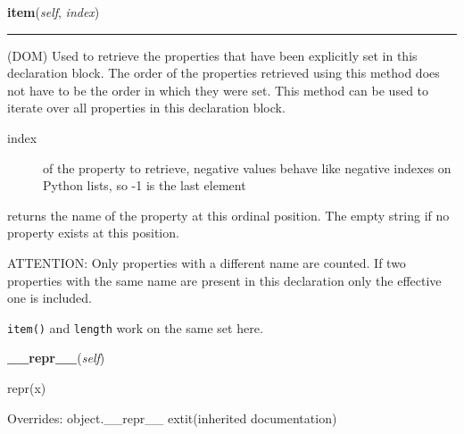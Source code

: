     \label{cssutils:css:cssstyledeclaration:CSSStyleDeclaration:item}

    \vspace{0.5ex}

\hspace{.8\funcindent}\begin{boxedminipage}{\funcwidth}

    \raggedright \textbf{item}(\textit{self}, \textit{index})

    \vspace{-1.5ex}

    \rule{\textwidth}{0.5\fboxrule}
\setlength{\parskip}{2ex}

(DOM)
Used to retrieve the properties that have been explicitly set in
this declaration block. The order of the properties retrieved using
this method does not have to be the order in which they were set.
This method can be used to iterate over all properties in this
declaration block.
\begin{description}
\item[{index}] \leavevmode 
of the property to retrieve, negative values behave like
negative indexes on Python lists, so -1 is the last element

\end{description}

returns the name of the property at this ordinal position. The
empty string if no property exists at this position.

ATTENTION:
Only properties with a different name are counted. If two
properties with the same name are present in this declaration
only the effective one is included.

\texttt{item()} and \texttt{length} work on the same set here.
\setlength{\parskip}{1ex}
    \end{boxedminipage}

    \vspace{0.5ex}

\hspace{.8\funcindent}\begin{boxedminipage}{\funcwidth}

    \raggedright \textbf{\_\_repr\_\_}(\textit{self})

\setlength{\parskip}{2ex}
    repr(x)

\setlength{\parskip}{1ex}
      Overrides: object.\_\_repr\_\_ 	extit{(inherited documentation)}

    \end{boxedminipage}

